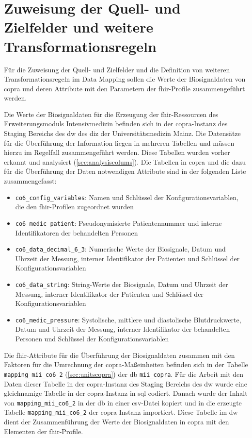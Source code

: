 \section{Zuweisung der Quell- und Zielfelder und weitere Transformationsregeln} \label{sec:transfer}

Für die Zuweisung der Quell- und Zielfelder und die Definition von weiteren Transformationsregeln im Data Mapping sollen die Werte der Biosignaldaten von \ac{copra} und deren Attribute mit den Parametern der \ac{fhir}-Profile zusammengeführt werden.

Die Werte der Biosignaldaten für die Erzeugung der \ac{fhir}-Ressourcen des Erweiterungsmoduls \glqq Intensivmedizin\grqq{} befinden sich in der \ac{copra}-Instanz des Staging Bereichs des \ac{dw} des \ac{diz} der Universitätsmedizin Mainz. Die Datensätze für die Überführung der Information liegen in mehreren Tabellen und müssen hierzu im Regelfall zusammengeführt werden. Diese Tabellen wurden vorher erkannt und analysiert (\ref{sec:analysiscolums}). Die Tabellen in \ac{copra} und die dazu für die Überführung der Daten notwendigen Attribute sind in der folgenden Liste zusammengefasst:
\begin{itemize}
  \item \texttt{co6\_config\_variables}: Namen und Schlüssel der Konfigurationsvariablen, die den \ac{fhir}-Profilen zugeordnet wurden
  \item \texttt{co6\_medic\_patient}: Pseudonymisierte Patientennummer und interne Identifikatoren der behandelten Personen
  \item \texttt{co6\_data\_decimal\_6\_3}: Numerische Werte der Biosignale, Datum und Uhrzeit der Messung, interner Identifikator der Patienten und Schlüssel der Konfigurationsvariablen
  \item \texttt{co6\_data\_string}: String-Werte der Biosignale, Datum und Uhrzeit der Messung, interner Identifikator der Patienten und Schlüssel der Konfigurationsvariablen
  \item \texttt{co6\_medic\_pressure}: Systolische, mittlere und diastolische Blutdruckwerte, Datum und Uhrzeit der Messung, interner Identifikator der behandelten Personen und Schlüssel der Konfigurationsvariablen
\end{itemize}

Die \ac{fhir}-Attribute für die Überführung der Biosignaldaten zusammen mit den Faktoren für die Umrechnung der \ac{copra}-Maßeinheiten befinden sich in der Tabelle \texttt{mapping\_mii\_co6\_2} (\ref{sec:unitscopra}) der \ac{db} \texttt{mii\_copra}. Für die Arbeit mit den Daten dieser Tabelle in der \ac{copra}-Instanz des Staging Bereichs des \ac{dw} wurde eine gleichnamige Tabelle in der \ac{copra}-Instanz in \ac{sql} codiert. Danach wurde der Inhalt von \texttt{mapping\_mii\_co6\_2} in der \ac{db} in einer \ac{csv}-Datei kopiert und in die erzeugte Tabelle \texttt{mapping\_mii\_co6\_2} der \ac{copra}-Instanz importiert. Diese Tabelle im \ac{dw} dient der Zusammenführung der Werte der Biosignaldaten in \ac{copra} mit den Elementen der \ac{fhir}-Profile.

